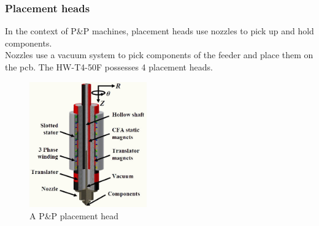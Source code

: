 \documentclass[a4paper,10pt]{report}
\begin{document}
\subsubsection{Placement heads}
In the context of P\&P machines, placement heads use nozzles to pick up and hold components.\\
Nozzles use a vacuum system to pick components of the feeder and place them on the pcb.
The HW-T4-50F possesses 4 placement heads.
\begin{figure}[!htb]
 \centering
 \includegraphics[width=0.45\textwidth]{placement_head.jpg}
 \caption{A P\&P placement head}
\end{figure}
\newpage
\end{document}
